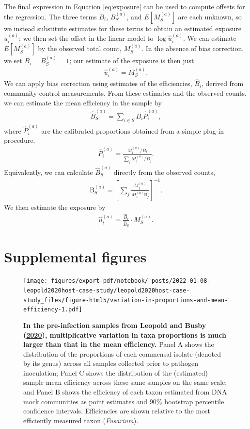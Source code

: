 \documentclass[
]{article}
\begin{document}
The final expression in Equation \eqref{eq:exposure} can be used to compute offsets for the regression.
The three terms \(B_i\), \(B_S^{(a)}\), and \(E[M_S^{(a)}]\) are each unknown, so we instead substitute estimates for these terms to obtain an estimated exposure \(\hat u_{i}^{(a)}\); we then set the offset in the linear model to \(\log \hat u_{i}^{(a)}\).
We can estimate \(E[M_S^{(a)}]\) by the observed total count, \(M_S^{(a)}\).
In the absence of bias correction, we set \(B_{i} = B_{S}^{(a)} = 1\); our estimate of the exposure is then just
\begin{align}
  \hat u_i^{(a)} = M_S^{(a)}.
\end{align}
We can apply bias correction using estimates of the efficiencies, \(\hat B_{i}\), derived from community control measurements.
From these estimates and the observed counts, we can estimate the mean efficiency in the sample by
\begin{align}
  \hat B_S^{(a)} = \sum_{i\in S} B_i \hat P_i^{(a)},
\end{align}
where \(\hat P_i^{(a)}\) are the calibrated proportions obtained from a simple plug-in procedure,
\begin{align}
  \hat P_i^{(a)} = \frac{M_i^{(a)} / B_i}{\sum_j M_j^{(a)} / B_j}.
\end{align}
Equivalently, we can calculate \(\hat B_S^{(a)}\) directly from the observed counts,
\begin{align}
  \text{B}_S^{(a)} =
  \left[\sum_j \frac{M_j^{(a)}}{M_S^{(a)} \text{B}_j}\right]^{-1}.
\end{align}
We then estimate the exposure by
\begin{align}
  \hat u_i^{(a)} = \frac{\hat B_i}{\hat B_S} \cdot M_S^{(a)}.
\end{align}

\clearpage

\hypertarget{supplemental-figures}{%
\section{Supplemental figures}\label{supplemental-figures}}

\begin{figure}
\centering
\texttt{[image: figures/export-pdf/notebook/\_posts/2022-01-08-leopold2020host-case-study/leopold2020host-case-study\_files/figure-html5/variation-in-proportions-and-mean-efficiency-1.pdf]}
\caption{\label{fig:leopold2020host-variation}\textbf{In the pre-infection samples from Leopold and Busby (\protect\hyperlink{ref-leopold2020host}{2020}), multiplicative variation in taxa proportions is much larger than that in the mean efficiency.} Panel A shows the distribution of the proportions of each commensal isolate (denoted by its genus) across all samples collected prior to pathogen inoculation; Panel C shows the distribution of the (estimated) sample mean efficiency across these same samples on the same scale; and Panel B shows the efficiency of each taxon estimated from DNA mock communities as point estimates and 90\% bootstrap percentile confidence intervals. Efficiencies are shown relative to the most efficiently measured taxon (\emph{Fusarium}).}
\end{figure}
\end{document}
